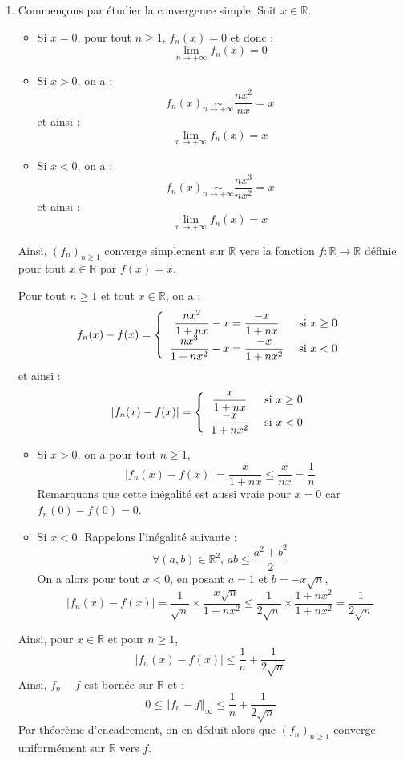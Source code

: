 \documentclass[a4paper,10pt]{report}
\begin{document}
\corr \begin{enumerate}
\item Commençons par étudier la convergence simple. Soit $x \in \mathbb{R}$.
\begin{itemize}
\item Si $x=0$, pour tout $n \geq 1$, $f_n(x)=0$ et donc :
$$ \lim_{n \rightarrow + \infty} f_n(x)=0$$
\item Si $x>0$, on a :
$$ f_n(x) \underset{n \rightarrow + \infty}{\sim} \dfrac{nx^2}{nx} = x$$
et ainsi :
$$ \lim_{n \rightarrow + \infty} f_n(x)=x$$
\item Si $x<0$, on a :
$$ f_n(x) \underset{n \rightarrow + \infty}{\sim} \dfrac{nx^3}{nx^2} = x$$
et ainsi :
$$ \lim_{n \rightarrow + \infty} f_n(x)=x$$
\end{itemize}
Ainsi, $(f_n)_{n \geq 1}$ converge simplement sur $\mathbb{R}$ vers la fonction $f : \mathbb{R} \rightarrow \mathbb{R}$ définie pour tout $x \in \mathbb{R}$ par $f(x)=x$.

\medskip

\noindent Pour tout $n \geq 1$ et tout $x \in \mathbb{R}$, on a :
$$ f_n(x)-f(x)= \left\lbrace \begin{array}{cl}
\dfrac{nx^2}{1+nx}-x = \dfrac{-x}{1+nx} & \hbox{ si } x \geq 0 \\
\dfrac{nx^3}{1+nx^2}-x =  \dfrac{-x}{1+nx^2}& \hbox{ si } x < 0 \\
\end{array}\right.$$
et ainsi :
$$ \vert f_n(x)-f(x) \vert = \left\lbrace \begin{array}{cl}
 \dfrac{x}{1+nx} & \hbox{ si } x \geq 0 \\
 \dfrac{-x}{1+nx^2}& \hbox{ si } x < 0 \\
\end{array}\right.$$
\begin{itemize}
\item Si $x > 0$, on a pour tout $n \geq 1$,
$$  \vert f_n(x)-f(x) \vert = \dfrac{x}{1+nx} \leq \dfrac{x}{nx} = \dfrac{1}{n}$$
Remarquons que cette inégalité est aussi vraie pour $x=0$ car $f_n(0)-f(0)=0$.
\item Si $x<0$. Rappelons l'inégalité suivante :
$$ \forall (a,b) \in \mathbb{R}^2, \, ab \leq \dfrac{a^2+b^2}{2}$$
On a alors pour tout $x<0$, en posant $a=1$ et $b=-x \sqrt{n}$,
$$ \vert f_n(x)-f(x) \vert = \dfrac{1}{\sqrt{n}} \times \dfrac{ -x \sqrt{n}}{1+nx^2} \leq \dfrac{1}{2\sqrt{n}} \times \dfrac{1+nx^2}{1+nx^2} = \dfrac{1}{2\sqrt{n}}$$
\end{itemize}
Ainsi, pour $x \in \mathbb{R}$ et pour $n \geq 1$, 
$$  \vert f_n(x)-f(x) \vert \leq \dfrac{1}{n} + \dfrac{1}{2\sqrt{n}}$$
Ainsi, $f_n-f$ est bornée sur $\mathbb{R}$ et :
$$ 0 \leq \Vert f_n-f \Vert_{\infty} \leq \dfrac{1}{n} + \dfrac{1}{2\sqrt{n}}$$
Par théorème d'encadrement, on en déduit alors que $(f_n)_{n \geq 1}$ converge uniformément sur $\mathbb{R}$ vers $f$.


\end{enumerate}
\end{document}

